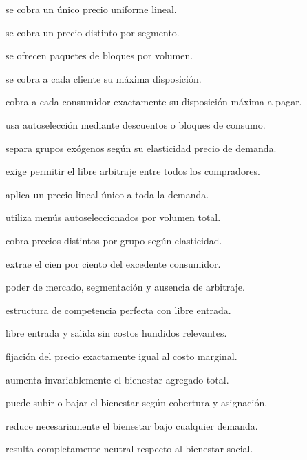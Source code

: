\begin{opts}
    \item se cobra un único precio uniforme lineal.
    \item se cobra un precio distinto por segmento.
    \item se ofrecen paquetes de bloques por volumen.
    \item se cobra a cada cliente su máxima disposición.
\end{opts}

\begin{opts}
    \item cobra a cada consumidor exactamente su disposición máxima a pagar.
    \item usa autoselección mediante descuentos o bloques de consumo.
    \item separa grupos exógenos según su elasticidad precio de demanda.
    \item exige permitir el libre arbitraje entre todos los compradores.
\end{opts}

\begin{opts}
    \item aplica un precio lineal único a toda la demanda.
    \item utiliza menús autoseleccionados por volumen total.
    \item cobra precios distintos por grupo según elasticidad.
    \item extrae el cien por ciento del excedente consumidor.
\end{opts}

\begin{opts}
    \item poder de mercado, segmentación y ausencia de arbitraje.
    \item estructura de competencia perfecta con libre entrada.
    \item libre entrada y salida sin costos hundidos relevantes.
    \item fijación del precio exactamente igual al costo marginal.
\end{opts}

\begin{opts}
    \item aumenta invariablemente el bienestar agregado total.
    \item puede subir o bajar el bienestar según cobertura y asignación.
    \item reduce necesariamente el bienestar bajo cualquier demanda.
    \item resulta completamente neutral respecto al bienestar social.
\end{opts}

